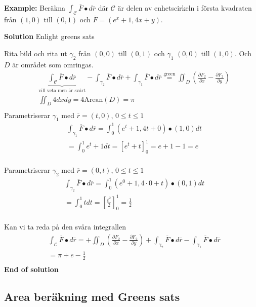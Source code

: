 \textbf{Example:}
Beräkna $\int_{\mathcal{C}} \overline{F}\bullet d\overline{r}$ där $\mathcal{C}$
är delen av enhetscirkeln i första kvadraten från $(1,0)$ till $(0,1)$ och 
$\overline{F}=(e^x +1, 4x + y)$. 

\textbf{Solution}
Enlight greens sats

Rita bild och rita ut $\gamma_2$ från $(0,0)$ till $(0,1)$ och $\gamma_1$ $(0,0)$ till $(1,0)$.
Och $D$ är området som omringas.
\begin{align*}
    &\underbrace{\int_{\mathcal{C}} \overline{F}\bullet d\overline{r}}_{\text{vill veta men är svårt}} 
    -\int_{\gamma_2} \overline{F}\bullet d\overline{r} 
    +\int_{\gamma_1} \overline{F}\bullet d\overline{r} 
    \stackrel{\text{green}}{=} \iint_{D} \left(\frac{\partial F_2}{\partial x} - \frac{\partial F_2}{\partial y}\right) \\
    &\iint_{D} 4 dxdy = 4\text{Arean}(D) = \pi \\
\end{align*}
Parametriserar $\gamma_1$ med $\overline{r} = (t,0)$, $0\leq t \leq 1$
\begin{align*}
    &\int_{\gamma_1} \overline{F}\bullet d\overline{r} = \int^{1}_{0} (e^t+1, 4t + 0)\bullet(1,0) dt \\
    &= \int^{1}_{0} e^t+1 dt = \left[ e^t+t \right]^{1}_{0} = e+1-1 = e \\
\end{align*}

Parametriserar $\gamma_2$ med $\overline{r} = (0,t)$, $0\leq t \leq 1$
\begin{align*}
    &\int_{\gamma_2} \overline{F}\bullet d\overline{r} = \int^{1}_{0} (e^0+1, 4\cdot0 + t)\bullet(0,1) dt \\
    &=\int^{1}_{0} t dt = \left[ \frac{t^2}{2} \right]^{1}_{0} = \frac{1}{2} \\
\end{align*}

Kan vi ta reda på den svåra integrallen 
\begin{align*}
    &\int_{\mathcal{C}} \overline{F}\bullet d\overline{r}
    =+\iint_{D} \left(\frac{\partial F_2}{\partial x} - \frac{\partial F_2}{\partial y}\right)
    +\int_{\gamma_2} \overline{F}\bullet d\overline{r}
    -\int_{\gamma_1} \overline{F}\bullet d\overline{r} \\
    &= \pi + e - \frac{1}{2} \\
\end{align*}
\textbf{End of solution}


\subsection{Area beräkning med Greens sats}


